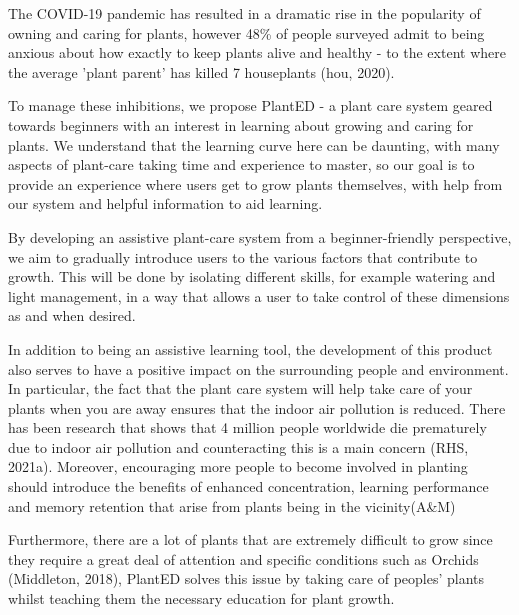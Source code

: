 \documentclass{article}
\begin{document}
The COVID-19 pandemic has resulted in a dramatic rise in the popularity of owning and caring for plants, however 48\% of people surveyed admit to being anxious about how exactly to keep plants alive and healthy - to the extent where the average 'plant parent' has killed 7 houseplants (hou, 2020). %

To manage these inhibitions, we propose PlantED - a plant care system geared towards beginners with an interest in learning about growing and caring for plants. We understand that the learning curve here can be daunting, with many aspects of plant-care taking time and experience to master, so our goal is to provide an experience where users get to grow plants themselves, with help from our system and helpful information to aid learning.

By developing an assistive plant-care system from a beginner-friendly perspective, we aim to gradually introduce users to the various factors that contribute to growth. This will be done by isolating different skills, for example watering and light management, in a way that allows a user to take control of these dimensions as and when desired. 

In addition to being an assistive learning tool, the development of this product also serves to have a positive impact on the surrounding people and environment. In particular, the fact that the plant care system will help take care of your plants when you are away ensures that the indoor air pollution is reduced. There has been research that shows that 4 million people worldwide die prematurely due to indoor air pollution and counteracting this is a main concern (RHS, 2021a). Moreover, encouraging more people to become involved in planting should introduce the benefits of enhanced concentration, learning performance and memory retention that arise from plants being in the vicinity(A&M) %

Furthermore, there are a lot of plants that are extremely difficult to grow since they require a great deal of attention and specific conditions such as Orchids (Middleton, 2018), PlantED solves this issue by taking care of peoples' plants whilst teaching them the necessary education for plant growth. 
\end{document}
